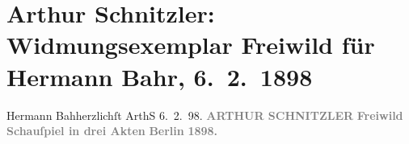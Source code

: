 

         
         \newcommand{\erwaehntePersonen}{Personen: Hermann Bahr}
         \newcommand{\erwaehnteInstitutionen}{Institutionen: S. Fischer Verlag}
         \newcommand{\erwaehnteOrte}{Orte: Berlin, Wien}
         \newcommand{\erwaehnteWerke}{Werke: Freiwild. Schauspiel in 3 Akten}
               \section[Arthur Schnitzler: Widmungsexemplar Freiwild für Hermann Bahr, 6. 2. 1898]{ Arthur Schnitzler: Widmungsexemplar Freiwild für Hermann Bahr, 6. 2. 1898}\nopagebreak{}\rehead{ }\begin{ledgroupsized}[t]{13cm}\normalsize\beginnumbering \toendnotes[C]{\smallbreak\pagebreak[2]} 
\pstart
           \noindent{}{\pb}Hermann Bah\damage{\textcolor{gray}{r}}{\\}herzlichſt\pend
           \pstart \spacefill\mbox{ArthS\damage{\textcolor{gray}{ch}}}\pend{}\pstart
           \noindent{}6. 2. 98.\pend
           {\bigskip}\pstart
           \noindent{}\centering{}\textcolor{gray}{\textbf{ARTHUR
               SCHNITZLER}}\pend
           {\bigskip}\pstart
           \noindent{}\centering{}\textcolor{gray}{\textbf{Freiwild}}\pend
           \pstart
           \noindent{}\centering{}\textcolor{gray}{\textbf{Schauſpiel in drei Akten}}\pend
           {\bigskip}\pstart
           \noindent{}\centering{}\textcolor{gray}{\textbf{\textbf{Berlin}}}\pend
           \pstart
           \noindent{}\centering{}\textcolor{gray}{\textbf{}}\pend
           \pstart
           \noindent{}\centering{}\textcolor{gray}{\textbf{1898.}}\pend
           
         
         \endnumbering{}\end{ledgroupsized}  \newcommand{\dateiname}{L00774}\newcommand{\titel}{Arthur Schnitzler: Widmungsexemplar Freiwild für Hermann Bahr, 6. 2. 1898}\newcommand{\editorInnen}{ Kurt Ifkovits,  Martin Anton Müller}
      